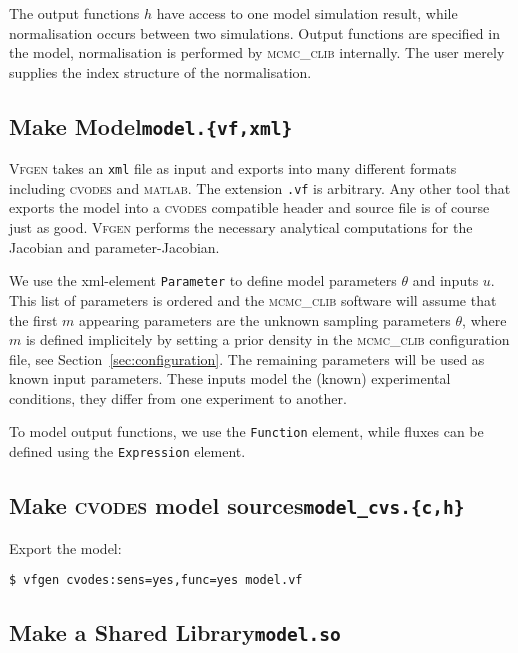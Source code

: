 \documentclass[english,12pt]{scrartcl}
\newcommand{\CLIB}{\textsc{mcmc\_clib}}
\begin{document}
The output functions $h$ have access to one model simulation result,
while normalisation occurs between two simulations. Output functions
are specified in the model, normalisation is performed by \CLIB{}
internally. The user merely supplies the index structure of the
normalisation.

\subsection[make model]{Make Model\hfill\texttt{model.\{vf,xml\}}}
\label{sec:model}

\textsc{Vfgen} takes an \texttt{xml} file as input and exports into
many different formats including \textsc{cvodes} and
\textsc{matlab}. The extension \texttt{.vf} is arbitrary. Any other
tool that exports the model into a \textsc{cvodes} compatible header
and source file is of course just as good. \textsc{Vfgen} performs the
necessary analytical computations for the Jacobian and
parameter-Jacobian.

We use the xml-element \texttt{Parameter} to define model parameters
$\theta$ and inputs $u$. This list of parameters is ordered and the
\CLIB{} software will assume that the first $m$ appearing parameters
are the unknown sampling parameters $\theta$, where $m$ is defined
implicitely by setting a prior density in the \CLIB{} configuration
file, see Section~\vref{sec:configuration}. The remaining parameters
will be used as known input parameters. These inputs model the (known)
experimental conditions, they differ from one experiment to another.

To model output functions, we use the \texttt{Function} element, while
fluxes can be defined using the \texttt{Expression} element.

\subsection[make \textsc{cvodes} model sources]{Make \textsc{cvodes}
  model sources\hfill\texttt{model\_cvs.\{c,h\}}}
\label{sec:c}

Export the model:
\begin{verbatim}
$ vfgen cvodes:sens=yes,func=yes model.vf
\end{verbatim}

\subsection[make a shared library]{Make a Shared Library\hfill\texttt{model.so}}
\label{sec:so}
\end{document}
